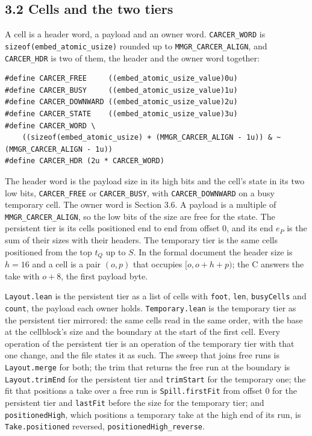 \subsection{\texorpdfstring{3.2 Cells and the two tiers}{3.2 Cells and the two tiers}}

A cell is a header word, a payload and an owner word. \texttt{CARCER\_\allowbreak{}WORD} is \texttt{sizeof(embed\_\allowbreak{}atomic\_\allowbreak{}usize)} rounded up to \texttt{MMGR\_\allowbreak{}CARCER\_\allowbreak{}ALIGN}, and \texttt{CARCER\_\allowbreak{}HDR} is two of them, the header and the owner word together:

\begin{Verbatim}
#define CARCER_FREE     ((embed_atomic_usize_value)0u)
#define CARCER_BUSY     ((embed_atomic_usize_value)1u)
#define CARCER_DOWNWARD ((embed_atomic_usize_value)2u)
#define CARCER_STATE    ((embed_atomic_usize_value)3u)
#define CARCER_WORD \
    ((sizeof(embed_atomic_usize) + (MMGR_CARCER_ALIGN - 1u)) & ~(MMGR_CARCER_ALIGN - 1u))
#define CARCER_HDR (2u * CARCER_WORD)
\end{Verbatim}

The header word is the payload size in its high bits and the cell's state in its two low bits, \texttt{CARCER\_\allowbreak{}FREE} or \texttt{CARCER\_\allowbreak{}BUSY}, with \texttt{CARCER\_\allowbreak{}DOWNWARD} on a busy temporary cell. The owner word is Section 3.6. A payload is a multiple of \texttt{MMGR\_\allowbreak{}CARCER\_\allowbreak{}ALIGN}, so the low bits of the size are free for the state. The persistent tier is its cells positioned end to end from offset 0, and its end \(e_P\) is the sum of their sizes with their headers. The temporary tier is the same cells positioned from the top \(t_Q\) up to \(S\). In the formal document the header size is \(h = 16\) and a cell is a pair \((o, p)\) that occupies \([o, o + h + p)\); the C answers the take with \(o + 8\), the first payload byte.

\texttt{Layout.\allowbreak{}lean} is the persistent tier as a list of cells with \texttt{foot}, \texttt{len}, \texttt{busy\allowbreak{}Cells} and \texttt{count}, the payload each owner holds. \texttt{Temporary.\allowbreak{}lean} is the temporary tier as the persistent tier mirrored: the same cells read in the same order, with the base at the cellblock's size and the boundary at the start of the first cell. Every operation of the persistent tier is an operation of the temporary tier with that one change, and the file states it as such. The sweep that joins free runs is \texttt{Layout.\allowbreak{}merge} for both; the trim that returns the free run at the boundary is \texttt{Layout.\allowbreak{}trim\allowbreak{}End} for the persistent tier and \texttt{trim\allowbreak{}Start} for the temporary one; the fit that positions a take over a free run is \texttt{Spill.\allowbreak{}first\allowbreak{}Fit} from offset 0 for the persistent tier and \texttt{last\allowbreak{}Fit} before the size for the temporary tier; and \texttt{positioned\allowbreak{}High}, which positions a temporary take at the high end of its run, is \texttt{Take.\allowbreak{}positioned} reversed, \texttt{positioned\allowbreak{}High\_\allowbreak{}reverse}.


